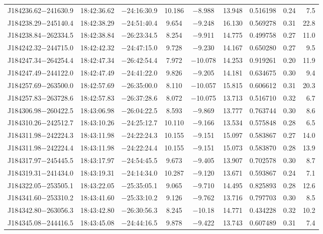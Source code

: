 \begin{table*}
\begin{tabular}{lcccccccr}
J184236.62$-$241630.9 & 18:42:36.62 & $-$24:16:30.9 & 10.186 & $-$8.988 & 13.948 & 0.516198 & 0.24 & 7.5 \\
J184238.29$-$245140.4 & 18:42:38.29 & $-$24:51:40.4 &  9.654 & $-$9.248 & 16.130 & 0.569278 & 0.31 & 22.8 \\
J184238.84$-$262334.5 & 18:42:38.84 & $-$26:23:34.5 &  8.254 & $-$9.911 & 14.775 & 0.499758 & 0.27 & 11.0 \\
J184242.32$-$244715.0 & 18:42:42.32 & $-$24:47:15.0 &  9.728 & $-$9.230 & 14.167 & 0.650280 & 0.27 & 9.5 \\
J184247.34$-$264254.4 & 18:42:47.34 & $-$26:42:54.4 &  7.972 & $-$10.078 & 14.253 & 0.919261 & 0.20 & 11.9 \\
J184247.49$-$244122.0 & 18:42:47.49 & $-$24:41:22.0 &  9.826 & $-$9.205 & 14.181 & 0.634675 & 0.30 & 9.4 \\
J184257.69$-$263500.0 & 18:42:57.69 & $-$26:35:00.0 &  8.110 & $-$10.057 & 15.815 & 0.606612 & 0.31 & 20.3 \\
J184257.83$-$263728.6 & 18:42:57.83 & $-$26:37:28.6 &  8.072 & $-$10.075 & 13.713 & 0.516710 & 0.32 & 6.7 \\
J184306.98$-$260422.5 & 18:43:06.98 & $-$26:04:22.5 &  8.593 & $-$9.869 & 13.777 & 0.763744 & 0.30 & 8.6 \\
J184310.26$-$242512.7 & 18:43:10.26 & $-$24:25:12.7 & 10.110 & $-$9.166 & 13.534 & 0.575848 & 0.28 & 6.5 \\
J184311.98$-$242224.3 & 18:43:11.98 & $-$24:22:24.3 & 10.155 & $-$9.151 & 15.097 & 0.583867 & 0.27 & 14.0 \\
J184311.98$-$242224.4 & 18:43:11.98 & $-$24:22:24.4 & 10.155 & $-$9.151 & 15.073 & 0.583870 & 0.28 & 13.9 \\
J184317.97$-$245445.5 & 18:43:17.97 & $-$24:54:45.5 &  9.673 & $-$9.405 & 13.907 & 0.702578 & 0.30 & 8.7 \\
J184319.31$-$241434.0 & 18:43:19.31 & $-$24:14:34.0 & 10.287 & $-$9.120 & 13.671 & 0.593867 & 0.24 & 7.1 \\
J184322.05$-$253505.1 & 18:43:22.05 & $-$25:35:05.1 &  9.065 & $-$9.710 & 14.495 & 0.825893 & 0.28 & 12.6 \\
J184341.60$-$253310.2 & 18:43:41.60 & $-$25:33:10.2 &  9.126 & $-$9.762 & 13.716 & 0.797703 & 0.30 & 8.5 \\
J184342.80$-$263056.3 & 18:43:42.80 & $-$26:30:56.3 &  8.245 & $-$10.18 & 14.771 & 0.434228 & 0.32 & 10.2 \\
J184345.08$-$244416.5 & 18:43:45.08 & $-$24:44:16.5 &  9.878 & $-$9.422 & 13.743 & 0.607489 & 0.31 & 7.4 \\

\end{tabular}
\end{table*}
